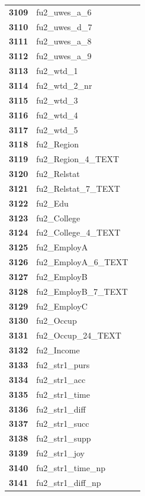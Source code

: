 \documentclass[
  letterpaper,
  DIV=11,
  numbers=noendperiod]{scrartcl}
\begin{document}
\begin{longtable}[t]{>{}cll}
\textbf{3109} & fu2\_uwes\_a\_6 & \\
\textbf{3110} & fu2\_uwes\_d\_7 & \\
\addlinespace
\textbf{3111} & fu2\_uwes\_a\_8 & \\
\textbf{3112} & fu2\_uwes\_a\_9 & \\
\textbf{3113} & fu2\_wtd\_1 & \\
\textbf{3114} & fu2\_wtd\_2\_nr & \\
\textbf{3115} & fu2\_wtd\_3 & \\
\addlinespace
\textbf{3116} & fu2\_wtd\_4 & \\
\textbf{3117} & fu2\_wtd\_5 & \\
\textbf{3118} & fu2\_Region & \\
\textbf{3119} & fu2\_Region\_4\_TEXT & \\
\textbf{3120} & fu2\_Relstat & \\
\addlinespace
\textbf{3121} & fu2\_Relstat\_7\_TEXT & \\
\textbf{3122} & fu2\_Edu & \\
\textbf{3123} & fu2\_College & \\
\textbf{3124} & fu2\_College\_4\_TEXT & \\
\textbf{3125} & fu2\_EmployA & \\
\addlinespace
\textbf{3126} & fu2\_EmployA\_6\_TEXT & \\
\textbf{3127} & fu2\_EmployB & \\
\textbf{3128} & fu2\_EmployB\_7\_TEXT & \\
\textbf{3129} & fu2\_EmployC & \\
\textbf{3130} & fu2\_Occup & \\
\addlinespace
\textbf{3131} & fu2\_Occup\_24\_TEXT & \\
\textbf{3132} & fu2\_Income & \\
\textbf{3133} & fu2\_str1\_purs & \\
\textbf{3134} & fu2\_str1\_acc & \\
\textbf{3135} & fu2\_str1\_time & \\
\addlinespace
\textbf{3136} & fu2\_str1\_diff & \\
\textbf{3137} & fu2\_str1\_succ & \\
\textbf{3138} & fu2\_str1\_supp & \\
\textbf{3139} & fu2\_str1\_joy & \\
\textbf{3140} & fu2\_str1\_time\_np & \\
\addlinespace
\textbf{3141} & fu2\_str1\_diff\_np & \\

\end{longtable}
\end{document}
